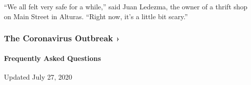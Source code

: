 ``We all felt very safe for a while,'' said Juan Ledezma, the owner of a
thrift shop on Main Street in Alturas. ``Right now, it's a little bit
scary.''

\href{https://www.nytimes.com/news-event/coronavirus?action=click\&pgtype=Article\&state=default\&region=MAIN_CONTENT_3\&context=storylines_faq}{}

\hypertarget{the-coronavirus-outbreak-}{%
\subsubsection{The Coronavirus Outbreak
›}\label{the-coronavirus-outbreak-}}

\hypertarget{frequently-asked-questions}{%
\paragraph{Frequently Asked
Questions}\label{frequently-asked-questions}}

Updated July 27, 2020


